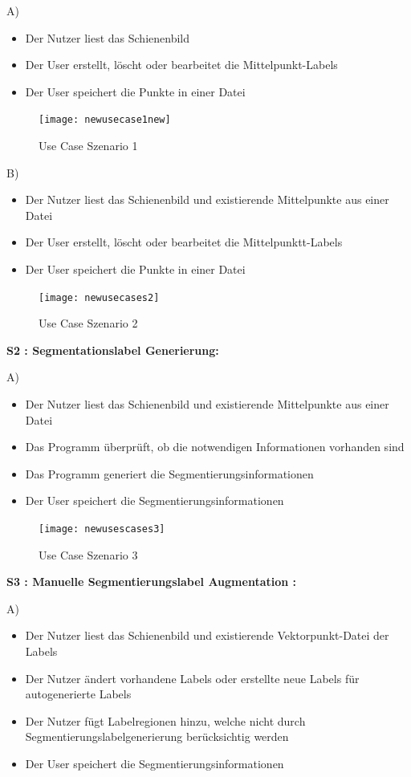 \documentclass[11pt]{scrartcl}
\begin{document}
\noindent
A)
\begin{itemize}
	\item Der Nutzer liest das Schienenbild
	\item Der User erstellt, löscht oder bearbeitet die Mittelpunkt-Labels
	\item Der User speichert die Punkte in einer Datei
\end{itemize}

\begin{figure}[H]
  \texttt{[image: newusecase1new]}
  \caption{Use Case Szenario 1}
\end{figure}

B)
\begin{itemize}
	\item Der Nutzer liest das Schienenbild und existierende Mittelpunkte aus einer Datei
	\item Der User erstellt, löscht oder bearbeitet die Mittelpunktt-Labels
	\item Der User speichert die Punkte in einer Datei
\end{itemize}

\begin{figure}[H]
  \texttt{[image: newusecases2]}
  \caption{Use Case Szenario 2}
\end{figure}

\noindent
\textbf{S2 : Segmentationslabel Generierung:} 
	
\noindent
A)
\begin{itemize}
	\item Der Nutzer liest das Schienenbild und existierende Mittelpunkte aus einer Datei
	\item Das Programm überprüft, ob die notwendigen Informationen vorhanden sind
	\item Das Programm generiert die Segmentierungsinformationen
	\item Der User speichert die Segmentierungsinformationen
\end{itemize}

\begin{figure}[H]
  \texttt{[image: newusescases3]}
  \caption{Use Case Szenario 3}
\end{figure}

\noindent
\textbf{S3 : Manuelle Segmentierungslabel Augmentation :} 
	
\noindent
A)
\begin{itemize}
	\item Der Nutzer liest das Schienenbild und existierende Vektorpunkt-Datei der Labels
	\item Der Nutzer ändert vorhandene Labels oder erstellte neue Labels für autogenerierte Labels
	\item Der Nutzer fügt Labelregionen hinzu, welche nicht durch Segmentierungslabelgenerierung berücksichtig werden
	\item Der User speichert die Segmentierungsinformationen
\end{itemize}
\end{document}

